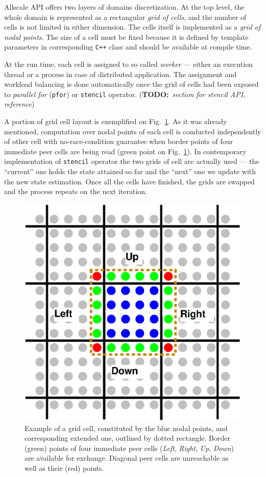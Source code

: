 \documentclass[acmsmall,review,anonymous]{acmart}\settopmatter{printfolios=true,printccs=false,printacmref=false}
\newcommand{\TODO}[1]{({\bf{{TODO:}}}\,\,\,{\footnotesize\it{#1}})}
\begin{document}
Allscale API offers two layers of domains discretization. At the top level, the whole domain is represented as a rectangular \textit{grid of cells}, and the number of cells is not limited in either dimension. The cells itself is implemented as a \textit{grid of nodal points}. The size of a cell must be fixed because it is defined by template parameters in corresponding \texttt{C++} class and should be available at compile time.

At the run time, each cell is assigned to so called \textit{worker} --- either an execution thread or a process in case of distributed application. The assignment and workload balancing is done automatically once the grid of cells had been exposed to \textit{parallel for} (\texttt{pfor}) or \texttt{stencil} operator. \TODO{section for stencil API, reference}

A portion of grid cell layout is exemplified on Fig.~\ref{fig:cell}. As it was already mentioned, computation over nodal points of each cell is conducted independently of other cell with no-race-condition guarantee when border points of four immediate peer cells are being read (green point on Fig.~\ref{fig:cell}). In contemporary implementation of \texttt{stencil} operator the two grids of cell are actually used --- the ``current'' one holds the state attained so far and the ``next'' one we update with the new state estimation. Once all the cells have finished, the grids are swapped and the process repeats on the next iteration.

\begin{figure}[!htb]
\includegraphics[scale=0.33]{images/subdomain.eps}
\caption{Example of a grid cell, constituted by the blue nodal points, and corresponding extended one, outlined by dotted rectangle. Border (green) points of four immediate peer cells (\textit{Left}, \textit{Right}, \textit{Up}, \textit{Down}) are available for exchange. Diagonal peer cells are unreachable as well as their (red) points.}
\label{fig:cell}
\end{figure}
\end{document}
